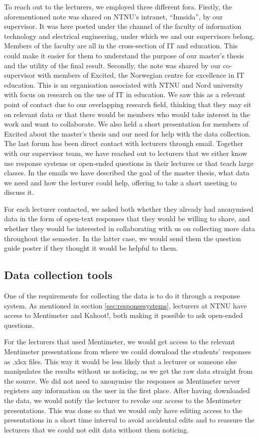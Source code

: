 To reach out to the lecturers, we employed three different fora. Firstly, the aforementioned note was shared on NTNU's intranet, ``Innsida'', by our supervisor. It was here posted under the channel of the faculty of information technology and electrical engineering, under which we and our supervisors belong. Members of the faculty are all in the cross-section of IT and education. This could make it easier for them to understand the purpose of our master's thesis and the utility of the final result. Secondly, the note was shared by our co-supervisor with members of Excited, the Norwegian centre for excellence in IT education. This is an organisation associated with NTNU and Nord university with focus on research on the use of IT in education. We saw this as a relevant point of contact due to our overlapping research field, thinking that they may sit on relevant data or that there would be members who would take interest in the work and want to collaborate. We also held a short presentation for members of Excited about the master's thesis and our need for help with the data collection. The last forum has been direct contact with lecturers through email. Together with our supervisor team, we have reached out to lecturers that we either know use response systems or open-ended questions in their lectures or that teach large classes. In the emails we have described the goal of the master thesis, what data we need and how the lecturer could help, offering to take a short meeting to discuss it.

For each lecturer contacted, we asked both whether they already had anonymised data in the form of open-text responses that they would be willing to share, and whether they would be interested in collaborating with us on collecting more data throughout the semester. In the latter case, we would send them the question guide poster if they thought it would be helpful to them.

\subsection{Data collection tools}
One of the requirements for collecting the data is to do it through a response system. As mentioned in section \ref{sec:responsesystems}, lecturers at NTNU have access to Mentimeter and Kahoot!, both making it possible to ask open-ended questions.

For the lecturers that used Mentimeter, we would get access to the relevant Mentimeter presentations from where we could download the students' responses as .xlsx files. This way it would be less likely that a lecturer or someone else manipulates the results without us noticing, as we get the raw data straight from the source. We did not need to anonymise the responses as Mentimeter never registers any information on the user in the first place. After having downloaded the data, we would notify the lecturer to revoke our access to the Mentimeter presentations. This was done so that we would only have editing access to the presentations in a short time interval to avoid accidental edits and to reassure the lecturers that we could not edit data without them noticing.

